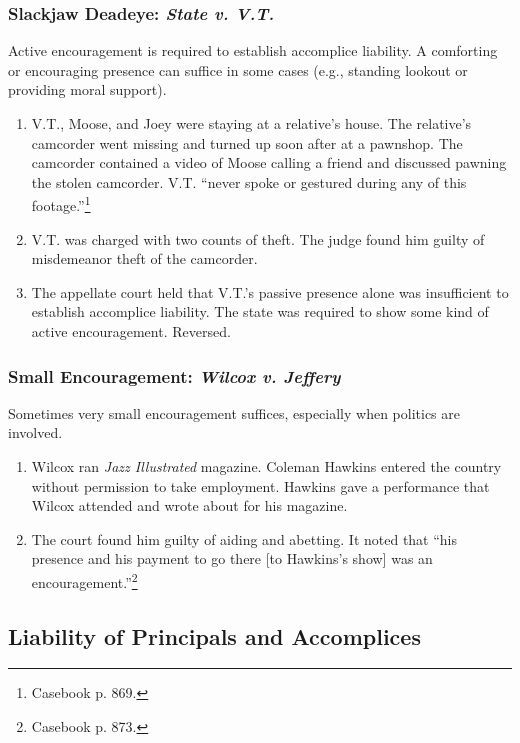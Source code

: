\subsubsection{Slackjaw Deadeye: \emph{State v. V.T.}}

Active encouragement is required to establish accomplice liability. A 
comforting or encouraging presence can suffice in some cases (e.g., standing   
lookout or providing moral support).

\begin{enumerate}
    \item V.T., Moose, and Joey were staying at a relative's house. The 
    relative's camcorder went missing and turned up soon after at a pawnshop. 
    The camcorder contained a video of Moose calling a friend and discussed 
    pawning the stolen camcorder. V.T. ``never spoke or gestured during any of 
    this footage.''\footnote{Casebook p. 869.}
    \item V.T. was charged with two counts of theft. The judge found him 
    guilty of misdemeanor theft of the camcorder.
    \item The appellate court held that V.T.'s passive presence alone was insufficient 
    to establish accomplice liability. The state was required to show some 
    kind of active encouragement. Reversed.
\end{enumerate}

\subsubsection{Small Encouragement: \emph{Wilcox v. Jeffery}}

Sometimes very small encouragement suffices, especially when politics are 
involved.

\begin{enumerate}
    \item Wilcox ran \emph{Jazz Illustrated} magazine. Coleman Hawkins entered 
    the country without permission to take employment. Hawkins gave a 
    performance that Wilcox attended and wrote about for his magazine.
    \item The court found him guilty of aiding and abetting. It noted that 
    ``his presence and his payment to go there [to Hawkins's show] was an 
    encouragement.''\footnote{Casebook p. 873.}
\end{enumerate}

\subsection{Liability of Principals and Accomplices}

